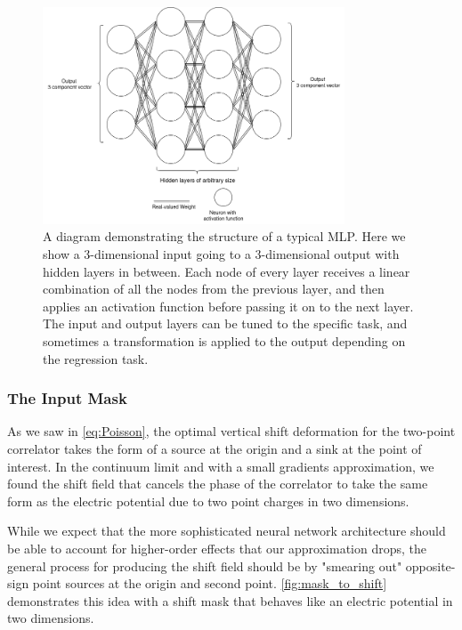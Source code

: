 \documentclass[12pt]{article}
\begin{document}
\begin{figure}
	\centering
	\includegraphics[width=0.8\textwidth]{figures/MLP.drawio.png}
	\caption[Multilayer Perceptron]{A diagram demonstrating the structure of a typical MLP. Here we show a 3-dimensional input going to
	a 3-dimensional output with hidden layers in between. Each node of every layer receives a linear combination of all the nodes
	from the previous layer, and then applies an activation function before passing it on to the next layer. The input and output
	layers can be tuned to the specific task, and sometimes a transformation is applied to the output depending on the regression task.}
	\label{fig:mlp}
\end{figure}

\subsubsection{The Input Mask}

As we saw in \ref{eq:Poisson}, the optimal vertical shift deformation for the two-point correlator takes the form of a source at the origin and
a sink at the point of interest. In the continuum limit and with a small gradients approximation, we found the shift field that cancels the phase of
the correlator to take the same form as the electric potential due to two point charges in two dimensions. 

While we expect that the more sophisticated neural network architecture should be able to account for higher-order effects that our approximation drops, 
the general process for producing the shift field should be by "smearing out" opposite-sign point sources at the origin and second point. \ref{fig:mask_to_shift} 
demonstrates this idea with a shift mask that behaves like an electric potential in two dimensions.
\end{document}

